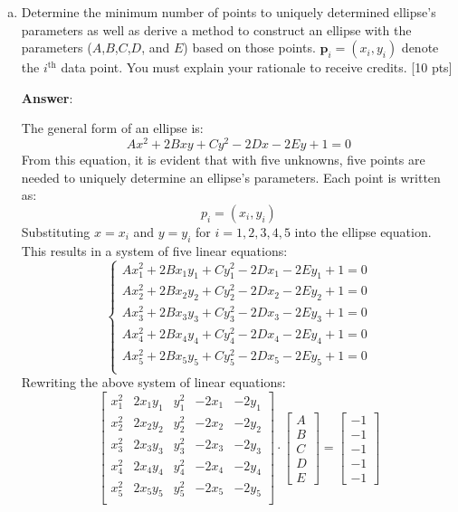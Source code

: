 \begin{enumerate}[a.)]  
\item Determine the minimum number of points to uniquely determined ellipse's parameters as well as derive a method to construct an ellipse with the parameters ($A$,$B$,$C$,$D$, and $E$) based on those points. $\mathbf{p}_i=(x_i,y_i)$ denote the $i^\text{th}$ data point. You must explain your rationale to receive credits. [10 pts]

\textbf{Answer}:

The general form of an ellipse is:
\begin{equation*}
    Ax^2+2Bxy+Cy^2-2Dx-2Ey+1=0
\end{equation*}
From this equation, it is evident that with five unknowns, five points are needed to uniquely determine an ellipse's parameters.
Each point is written as:
\[
p_i = (x_i, y_i)
\]
Substituting \(x = x_i\) and \(y = y_i\) for \(i = 1, 2, 3, 4, 5\) into the ellipse equation.
This results in a system of five linear equations:
\[
\begin{cases}
A x_1^2 + 2B x_1 y_1 + C y_1^2 - 2D x_1 - 2E y_1 + 1 = 0 \\
A x_2^2 + 2B x_2 y_2 + C y_2^2 - 2D x_2 - 2E y_2 + 1 = 0 \\
A x_3^2 + 2B x_3 y_3 + C y_3^2 - 2D x_3 - 2E y_3 + 1 = 0 \\
A x_4^2 + 2B x_4 y_4 + C y_4^2 - 2D x_4 - 2E y_4 + 1 = 0 \\
A x_5^2 + 2B x_5 y_5 + C y_5^2 - 2D x_5 - 2E y_5 + 1 = 0 \\
\end{cases}
\]
Rewriting the above system of linear equations:
\[
\begin{bmatrix}
x_1^2 & 2x_1 y_1 & y_1^2 & -2x_1 & -2y_1 \\
x_2^2 & 2x_2 y_2 & y_2^2 & -2x_2 & -2y_2 \\
x_3^2 & 2x_3 y_3 & y_3^2 & -2x_3 & -2y_3 \\
x_4^2 & 2x_4 y_4 & y_4^2 & -2x_4 & -2y_4 \\
x_5^2 & 2x_5 y_5 & y_5^2 & -2x_5 & -2y_5 \\
\end{bmatrix} \cdot
\begin{bmatrix}
A \\ B \\ C \\ D \\ E
\end{bmatrix}
=
\begin{bmatrix}
-1 \\ -1 \\ -1 \\ -1 \\ -1

\end{bmatrix}\]
\end{enumerate}
